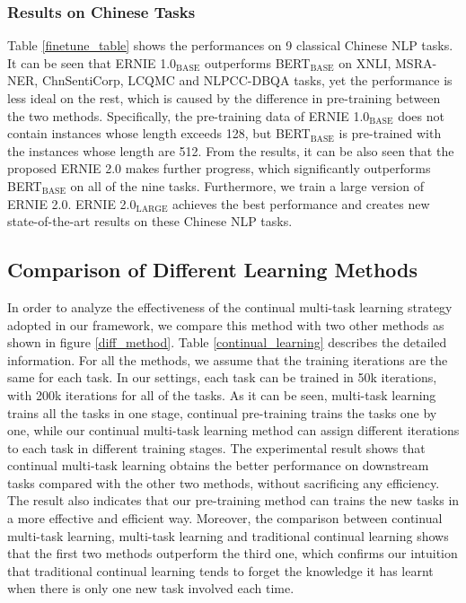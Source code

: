 \documentclass[letterpaper]{article} \usepackage{aaai20}  \usepackage{times}  \usepackage{helvet} \usepackage{courier}  \usepackage[hyphens]{url}  \usepackage{graphicx} \usepackage{makecell}
\begin{document}
\subsubsection{Results on Chinese Tasks}
Table \ref{finetune_table} shows the performances on 9 classical Chinese NLP tasks. It can be seen that ERNIE 1.0$_\text{BASE}$ outperforms BERT$_\text{BASE}$ on XNLI, MSRA-NER, ChnSentiCorp, LCQMC and NLPCC-DBQA tasks, yet the performance is less ideal on the rest, which is caused by the difference in pre-training between the two methods. Specifically, the pre-training data of ERNIE 1.0$_\text{BASE}$ does not contain instances whose length exceeds 128, but BERT$_\text{BASE}$ is pre-trained with the instances whose length are 512. From the results, it can be also seen that the proposed ERNIE 2.0 makes further progress, which significantly outperforms BERT$_\text{BASE}$ on all of the nine tasks. Furthermore, we train a large version of ERNIE 2.0. ERNIE 2.0$_\text{LARGE}$ achieves the best performance and creates new state-of-the-art results on these Chinese NLP tasks. 

\subsection{Comparison of Different Learning Methods}
In order to analyze the effectiveness of the continual multi-task learning strategy adopted in our framework, we compare this method with two other methods as shown in figure \ref{diff_method}. Table \ref{continual_learning} describes the detailed information. For all the methods, we assume that the training iterations are the same for each task. In our settings, each task can be trained in 50k iterations, with 200k iterations for all of the tasks. As it can be seen, multi-task learning trains all the tasks in one stage, continual pre-training trains the tasks one by one, while our continual multi-task learning method can assign different iterations to each task in different training stages.
The experimental result shows that continual multi-task learning obtains the better performance on downstream tasks compared with the other two methods, without sacrificing any efficiency. The result also indicates that our pre-training method can trains the new tasks in a more effective and efficient way. Moreover, the comparison between continual multi-task learning, multi-task learning and traditional continual learning shows that the first two methods outperform the third one, which confirms our intuition that traditional continual learning tends to forget the knowledge it has learnt when there is only one new task involved each time. 
\end{document}
